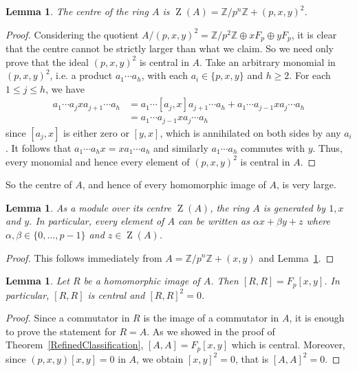 \documentclass[11pt]{article}
\DeclareMathOperator{\Z}{Z}
\newtheorem{lemma}[corollary]{Lemma}
\theoremstyle{definition}
\begin{document}
\begin{lemma}\label{CentreofA}
The centre of the ring $A$ is $\Z(A)=\mathbb{Z}/p^n\mathbb{Z}+(p,x,y)^2$. 
\end{lemma}

\begin{proof}
Considering the quotient $A/(p,x,y)^2=\mathbb{Z}/p^2\mathbb{Z}\oplus x F_p \oplus y F_p$, it is clear that the centre cannot be strictly larger than what we claim. So we need only prove that the ideal $(p,x,y)^2$ is central in $A$. Take an arbitrary monomial in $(p,x,y)^2$, i.e. a product $a_1\cdots a_h$, with each $a_i\in\lbrace p,x,y\rbrace$ and $h\geq 2$. For each $1\leq j\leq h$, we have
\begin{align*}
a_1\cdots a_j x a_{j+1}\cdots a_h&=a_1\cdots [a_j, x]a_{j+1}\cdots a_h+a_1\cdots a_{j-1} x a_{j}\cdots a_h\\
&=a_1\cdots a_{j-1} x a_{j}\cdots a_h
\end{align*}
since $[a_j, x]$ is either zero or $[y,x]$, which is annihilated on both sides by any $a_i$. It follows that $a_1\cdots a_hx=xa_1\cdots a_h$ and similarly $a_1\cdots a_h$ commutes with $y$. Thus, every monomial and hence every element of $(p,x,y)^2$ is central in $A$.
\end{proof}

So the centre of $A$, and hence of every homomorphic image of $A$, is very large.

\begin{lemma}\label{A3GenOverCentre}
As a module over its centre $\Z(A)$, the ring $A$ is generated by $1,x$ and $y$. In particular, every element of $A$ can be written as $\alpha x+\beta y+z$
where $\alpha,\beta\in\lbrace 0,\ldots,p-1\rbrace$ and $z\in\Z(A)$.
\end{lemma}

\begin{proof}
This follows immediately from $A=\mathbb{Z}/p^n\mathbb{Z}+(x,y)$ and Lemma~\ref{CentreofA}.
\end{proof}

\begin{lemma}\label{CommutatorIdealofR}
Let $R$ be a homomorphic image of $A$. Then $[R,R]=F_p[x,y]$. In particular, $[R,R]$ is central and $[R,R]^2=0$.
\end{lemma}

\begin{proof}
Since a commutator in $R$ is the image of a commutator in $A$, it is enough to prove the statement for $R=A$. As we showed in the proof of Theorem~\ref{RefinedClassification}, $[A,A]=F_p[x,y]$ which is central. Moreover, since $(p,x,y)[x,y]=0$ in $A$, we obtain $[x,y]^2=0$, that is $[A,A]^2=0$.
\end{proof}
\end{document}
